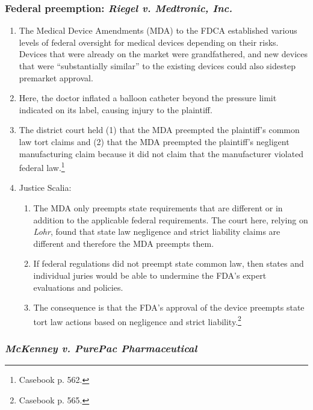 \subsubsection{Federal preemption: \emph{Riegel v. Medtronic, Inc.}}

\begin{enumerate}
    \item The Medical Device Amendments (MDA) to the FDCA established various 
    levels of federal oversight for medical devices depending on their risks.  
    Devices that were already on the market were grandfathered, and new devices 
    that were ``substantially similar'' to the existing devices could also 
    sidestep premarket approval.
    \item Here, the doctor inflated a balloon catheter beyond the pressure limit 
    indicated on its label, causing injury to the plaintiff.
    \item The district court held (1) that the MDA preempted the plaintiff's 
    common law tort claims and (2) that the MDA preempted the plaintiff's 
    negligent manufacturing claim because it did not claim that the manufacturer 
    violated federal law.\footnote{Casebook p. 562.}
    \item Justice Scalia:
    \begin{enumerate}
        \item The MDA only preempts state requirements that are different or in 
        addition to the applicable federal requirements. The court here, relying 
        on \emph{Lohr}, found that state law negligence and strict liability 
        claims are different and therefore the MDA preempts them.
        \item If federal regulations did not preempt state common law, then 
        states and individual juries would be able to undermine the FDA's expert 
        evaluations and policies.
        \item The consequence is that the FDA's approval of the device preempts 
        state tort law actions based on negligence and strict 
        liability.\footnote{Casebook p. 565.}
    \end{enumerate}
\end{enumerate}

\subsubsection{\emph{McKenney v. PurePac Pharmaceutical}}

